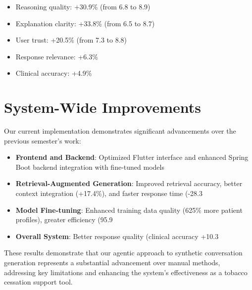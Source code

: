 


\begin{itemize}
    \item Reasoning quality: +30.9\% (from 6.8 to 8.9)
    \item Explanation clarity: +33.8\% (from 6.5 to 8.7)
    \item User trust: +20.5\% (from 7.3 to 8.8)
    \item Response relevance: +6.3\%
    \item Clinical accuracy: +4.9\%
\end{itemize}



\section{System-Wide Improvements}

Our current implementation demonstrates significant advancements over the previous semester's work:

\begin{itemize}
    \item \textbf{Frontend and Backend}: Optimized Flutter interface and enhanced Spring Boot backend integration with fine-tuned models
    
    \item \textbf{Retrieval-Augmented Generation}: Improved retrieval accuracy, better context integration (+17.4\%), and faster response time (-28.3%
    
    \item \textbf{Model Fine-tuning}: Enhanced training data quality (625\% more patient profiles), greater efficiency (95.9%
    
    \item \textbf{Overall System}: Better response quality (clinical accuracy +10.3%
\end{itemize}

These results demonstrate that our agentic approach to synthetic conversation generation represents a substantial advancement over manual methods, addressing key limitations and enhancing the system's effectiveness as a tobacco cessation support tool.
